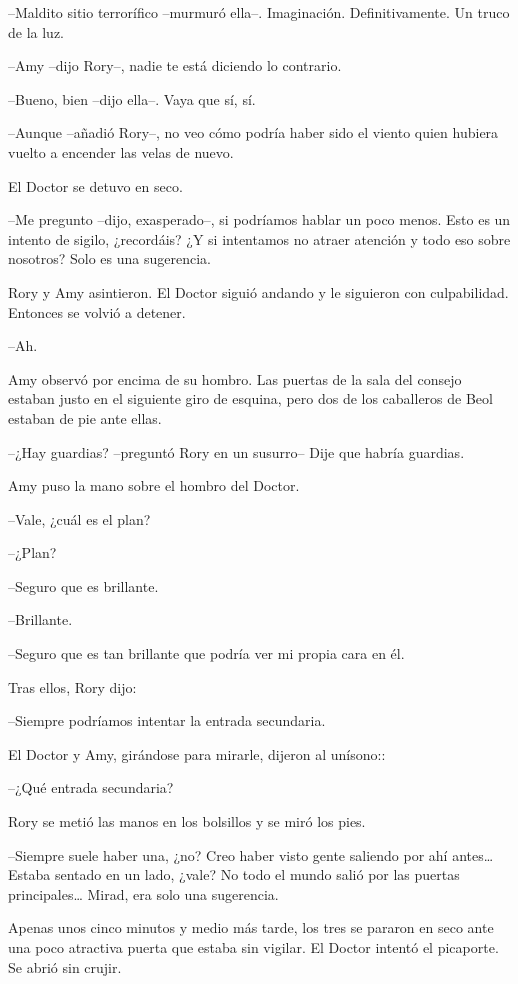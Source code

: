 {--Maldito sitio terrorífico --murmuró ella--. Imaginación.
Definitivamente. Un truco de la luz.}

{--Amy --dijo Rory--, nadie te está diciendo lo contrario.}

{--Bueno, bien --dijo ella--. Vaya que sí, sí.}

{--Aunque --añadió Rory--, no veo cómo podría haber sido el viento
quien hubiera vuelto a encender las velas de nuevo.}

{El Doctor se detuvo en seco.}

{--Me pregunto --dijo, exasperado--, si podríamos hablar un poco
	menos. Esto es un intento de sigilo, ¿recordáis? ¿Y si intentamos no
atraer atención y todo eso sobre nosotros? Solo es una sugerencia.}

{Rory y Amy asintieron. El Doctor siguió andando y le siguieron con
culpabilidad. Entonces se volvió a detener.}

{--Ah.}

{Amy observó por encima de su hombro. Las puertas de la sala del consejo
	estaban justo en el siguiente giro de esquina, pero dos de los
caballeros de Beol estaban de pie ante ellas.}

{--¿Hay guardias? --preguntó Rory en un susurro-- Dije que habría
guardias.}

{Amy puso la mano sobre el hombro del Doctor.}

{--Vale, ¿cuál es el plan?}

{--¿Plan?}

{--Seguro que es brillante.}

{--Brillante.}

{--Seguro que es tan brillante que podría ver mi propia cara en él.}

{Tras ellos, Rory dijo:}

{--Siempre podríamos intentar la entrada secundaria.}

{El Doctor y Amy, girándose para mirarle, dijeron al unísono::}

{--¿Qué entrada secundaria?}

{Rory se metió las manos en los bolsillos y se miró los pies.}

{--Siempre suele haber una, ¿no? Creo haber visto gente saliendo por
	ahí antes\ldots{} Estaba sentado en un lado, ¿vale? No todo el mundo
	salió por las puertas principales\ldots{} Mirad, era solo una
sugerencia.}

{Apenas unos cinco minutos y medio más tarde, los tres se pararon en
	seco ante una poco atractiva puerta que estaba sin vigilar. El Doctor
intentó el picaporte. Se abrió sin crujir.}

